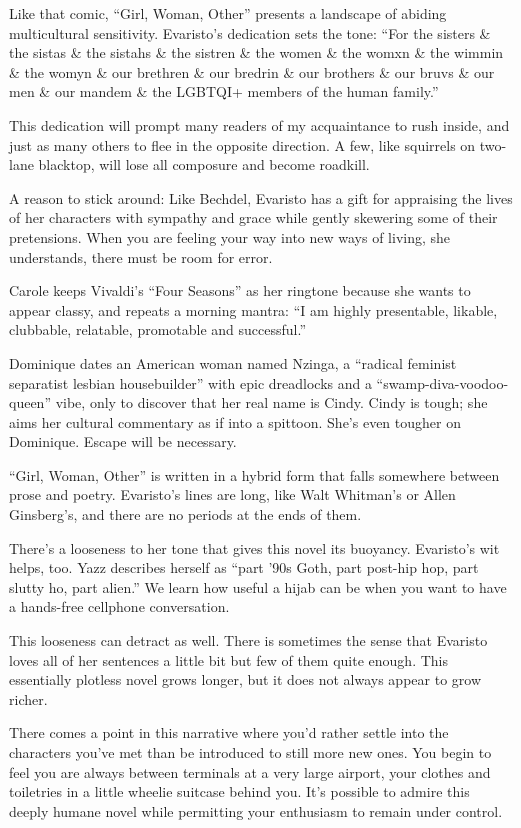 Like that comic, ``Girl, Woman, Other'' presents a landscape of abiding
multicultural sensitivity. Evaristo's dedication sets the tone: ``For
the sisters \& the sistas \& the sistahs \& the sistren \& the women \&
the womxn \& the wimmin \& the womyn \& our brethren \& our bredrin \&
our brothers \& our bruvs \& our men \& our mandem \& the LGBTQI+
members of the human family.''

This dedication will prompt many readers of my acquaintance to rush
inside, and just as many others to flee in the opposite direction. A
few, like squirrels on two-lane blacktop, will lose all composure and
become roadkill.

A reason to stick around: Like Bechdel, Evaristo has a gift for
appraising the lives of her characters with sympathy and grace while
gently skewering some of their pretensions. When you are feeling your
way into new ways of living, she understands, there must be room for
error.

Carole keeps Vivaldi's ``Four Seasons'' as her ringtone because she
wants to appear classy, and repeats a morning mantra: ``I am highly
presentable, likable, clubbable, relatable, promotable and successful.''

Dominique dates an American woman named Nzinga, a ``radical feminist
separatist lesbian housebuilder'' with epic dreadlocks and a
``swamp-diva-voodoo-queen'' vibe, only to discover that her real name is
Cindy. Cindy is tough; she aims her cultural commentary as if into a
spittoon. She's even tougher on Dominique. Escape will be necessary.

``Girl, Woman, Other'' is written in a hybrid form that falls somewhere
between prose and poetry. Evaristo's lines are long, like Walt Whitman's
or Allen Ginsberg's, and there are no periods at the ends of them.

There's a looseness to her tone that gives this novel its buoyancy.
Evaristo's wit helps, too. Yazz describes herself as ``part '90s Goth,
part post-hip hop, part slutty ho, part alien.'' We learn how useful a
hijab can be when you want to have a hands-free cellphone conversation.

This looseness can detract as well. There is sometimes the sense that
Evaristo loves all of her sentences a little bit but few of them quite
enough. This essentially plotless novel grows longer, but it does not
always appear to grow richer.

There comes a point in this narrative where you'd rather settle into the
characters you've met than be introduced to still more new ones. You
begin to feel you are always between terminals at a very large airport,
your clothes and toiletries in a little wheelie suitcase behind you.
It's possible to admire this deeply humane novel while permitting your
enthusiasm to remain under control.

